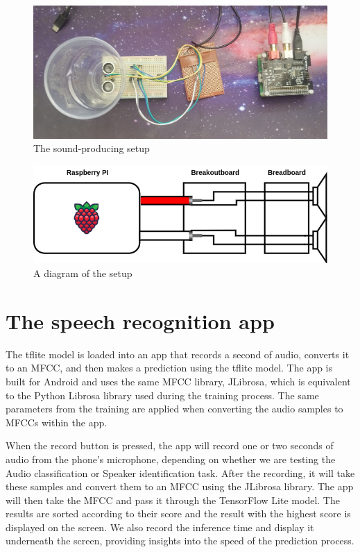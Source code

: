 \documentclass{report}
\theoremstyle{definition}
\theoremstyle{remark}
\begin{document}
\begin{figure}[!hbt]
    \centering
    \includegraphics[width=\textwidth]{img/setup.jpg}
    \caption{The sound-producing setup}
    \label{fig:reallife-setup}
\end{figure}

\begin{figure}[!hbt]
    \centering
    \includegraphics[width=\textwidth]{img/diagram.png}
    \caption{A diagram of the setup}
    \label{fig:diagram-setup}
\end{figure}

\section{The speech recognition app}
The tflite model is loaded into an app that records a second of audio, converts it to an MFCC, and then makes a prediction using the tflite model. The app is built for Android and uses the same MFCC library, JLibrosa, which is equivalent to the Python Librosa library used during the training process. The same parameters from the training are applied when converting the audio samples to MFCCs within the app. 

When the record button is pressed, the app will record one or two seconds of audio from the phone's microphone, depending on whether we are testing the Audio classification or Speaker identification task. After the recording, it will take these samples and convert them to an MFCC using the JLibrosa library\cite{Jlibrosa}. The app will then take the MFCC and pass it through the TensorFlow Lite model. The results are sorted according to their score and the result with the highest score is displayed on the screen. We also record the inference time and display it underneath the screen, providing insights into the speed of the prediction process.
\end{document}
